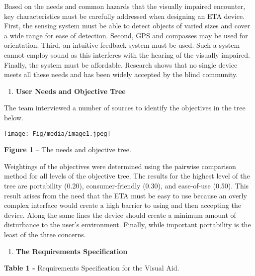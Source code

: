 Based on the needs and common hazards that the visually impaired
encounter, key characteristics must be carefully addressed when
designing an ETA device. First, the sensing system must be able to
detect objects of varied sizes and cover a wide range for ease of
detection. Second, GPS and compasses may be used for orientation. Third,
an intuitive feedback system must be used. Such a system cannot employ
sound as this interferes with the hearing of the visually impaired.
Finally, the system must be affordable. Research shows that no single
device meets all these needs and has been widely accepted by the blind
community.

\begin{enumerate}
\def\labelenumi{\arabic{enumi}.}
\setcounter{enumi}{3}
\item
  \textbf{User Needs and Objective Tree}
\end{enumerate}

The team interviewed a number of sources to identify the objectives in
the tree below.

\texttt{[image: Fig/media/image1.jpeg]}

\textbf{Figure 1} -- The needs and objective tree.

Weightings of the objectives were determined using the pairwise
comparison method for all levels of the objective tree. The results for
the highest level of the tree are portability (0.20), consumer-friendly
(0.30), and ease-of-use (0.50). This result arises from the need that
the ETA must be easy to use because an overly complex interface would
create a high barrier to using and then accepting the device. Along the
same lines the device should create a minimum amount of disturbance to
the user's environment. Finally, while important portability is the
least of the three concerns.

\begin{enumerate}
\def\labelenumi{\arabic{enumi}.}
\item
  \textbf{The Requirements Specification}
\end{enumerate}

\textbf{Table 1 -} Requirements Specification for the Visual Aid.

